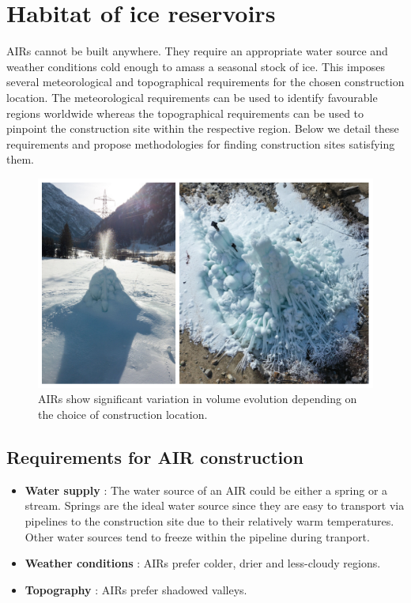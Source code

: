 \chapter{Habitat of ice reservoirs}

AIRs cannot be built anywhere. They require an appropriate water source and weather conditions cold enough to
amass a seasonal stock of ice. This imposes several meteorological and topographical requirements for the chosen
construction location. The meteorological requirements can be used to identify favourable regions worldwide
whereas the topographical requirements can be used to pinpoint the construction site within the respective
region. Below we detail these requirements and propose methodologies for finding construction sites satisfying
them. 

\begin{figure}[t]
\centering
\includegraphics[width=12cm]{Figures/2AIRs.jpg}

\caption{AIRs show significant variation in volume evolution depending on the choice of construction location.}

\label{fig:2AIRs}
\end{figure}

\section{Requirements for AIR construction}

\begin{itemize}
  \item {\bf Water supply} : The water source of an AIR could be either a spring or a stream. Springs are the ideal
    water source since they are easy to transport via pipelines to the construction site due to their relatively
    warm temperatures. Other water sources tend to freeze within the pipeline during tranport. 

  \item {\bf Weather conditions} : AIRs prefer colder, drier and less-cloudy regions.

  \item {\bf Topography} : AIRs prefer shadowed valleys.

\end{itemize}

